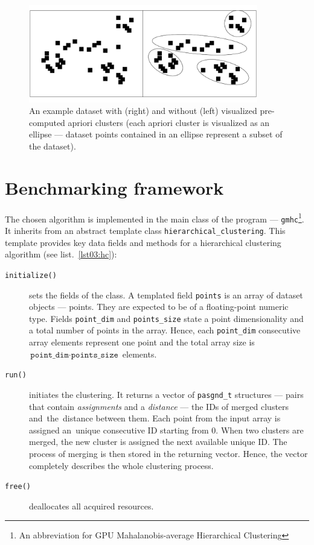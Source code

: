 \begin{figure}\centering
	\includegraphics[width=10cm]{img/apriori_example}
	\caption{An example dataset with (right) and without (left) visualized pre-computed apriori clusters (each apriori cluster is visualized as an ellipse --- dataset points contained in an ellipse represent a subset of the dataset).}
	\label{fig03:apr_ex}
\end{figure}

\section{Benchmarking framework}

The chosen algorithm is implemented in the main class of the program --- \texttt{gmhc}\footnote{An abbreviation for GPU Mahalanobis-average Hierarchical Clustering}. It inherits from an abstract template class \texttt{hierarchical\_clustering}.
This template provides key data fields and methods for a hierarchical clustering algorithm (see list.~\ref{lst03:hc}): 

\begin{description}
	\item[\texttt{initialize()}] sets the fields of the class. A templated field \texttt{points} is an array of dataset objects --- points. They are expected to be of a floating-point numeric type. Fields \texttt{point\_dim} and \texttt{points\_size} state a point dimensionality and a total number of points in the array. Hence, each \texttt{point\_dim} consecutive array elements represent one point and the total array size is~$\texttt{point\_dim}\cdot\texttt{points\_size}$ elements.
	
	\item[\texttt{run()}] initiates the clustering. It returns a vector of \texttt{pasgnd\_t} structures --- pairs that contain \emph{assignments} and a \emph{distance} --- the IDs of merged clusters and~the~distance between them. Each point from the input array is assigned an~unique consecutive ID starting from $0$. When two clusters are merged, the new cluster is assigned the next available unique ID. The process of merging is then stored in the returning vector. Hence, the vector completely describes the whole clustering process.
	
	\item[\texttt{free()}] deallocates all acquired resources.
\end{description}

